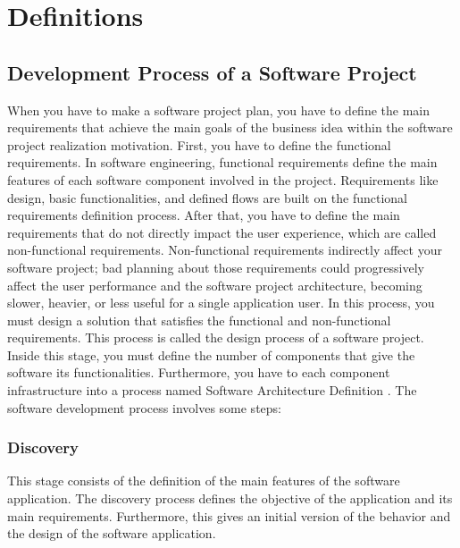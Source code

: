 
\chapter{Definitions}
\label{cha:definitions}

\section{Development Process of a Software Project}
When you have to make a software project plan, you have to define the main requirements that achieve the main goals of the business idea within the software project realization motivation. First, you have to define the functional requirements. In software engineering, functional requirements define the main features of each software component involved in the project. Requirements like design, basic functionalities, and defined flows are built on the functional requirements definition process.
After that, you have to define the main requirements that do not directly impact the user experience, which are called non-functional requirements. Non-functional requirements indirectly affect your software project; bad planning about those requirements could progressively affect the user performance and the software project architecture, becoming slower, heavier, or less useful for a single application user. In this process, you must design a solution that satisfies the functional and non-functional requirements. This process is called the design process of a software project. Inside this stage, you must define the number of components that give the software its functionalities. Furthermore, you have to each component infrastructure into a process named Software Architecture Definition \citet{software-engineering-book}.  The software development process involves some steps: 

\subsection{Discovery}
This stage consists of the definition of the main features of the software application. The discovery process defines the objective of the application and its main requirements. Furthermore, this gives an initial version of the behavior and the design of the software application.


